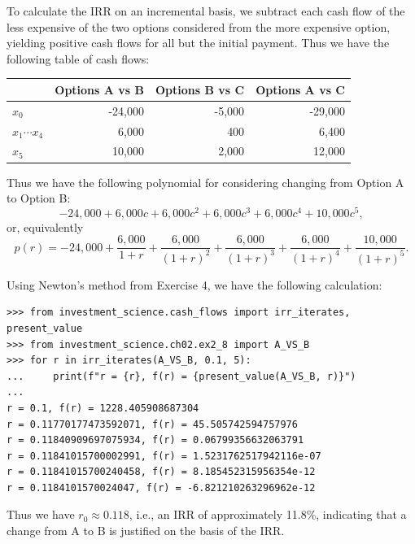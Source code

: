 To calculate the IRR on an incremental basis, we subtract each cash flow of
the less expensive of the two options considered from the more expensive
option, yielding positive cash flows for all but the initial payment. Thus we
have the following table of cash flows:
\begin{center}
    \begin{tabular}{l|r|r|r}
        & Options A vs B & Options B vs C & Options A vs C \\
        \hline
        $x_0$ & -24,000 & -5,000 & -29,000 \\
        $x_1 \cdots x_4$ & 6,000 & 400 & 6,400 \\
        $x_5$ & 10,000 & 2,000 & 12,000
    \end{tabular}
\end{center}

Thus we have the following polynomial for considering changing from Option A
to Option B:
\[
    -24,000 + 6,000c + 6,000c^2 + 6,000c^3 + 6,000c^4 + 10,000c^5,
\]
or, equivalently
\[
    p(r) = -24,000 + \frac{6,000}{1 + r} + \frac{6,000}{{(1 + r)}^2}
    + \frac{6,000}{{(1 + r)}^3} + \frac{6,000}{{(1 + r)}^4}
    + \frac{10,000}{{(1 + r)}^5}.
\]

Using Newton's method from Exercise 4, we have the following calculation:
\begin{lstlisting}
>>> from investment_science.cash_flows import irr_iterates, present_value
>>> from investment_science.ch02.ex2_8 import A_VS_B
>>> for r in irr_iterates(A_VS_B, 0.1, 5):
...     print(f"r = {r}, f(r) = {present_value(A_VS_B, r)}")
...
r = 0.1, f(r) = 1228.405908687304
r = 0.11770177473592071, f(r) = 45.505742594757976
r = 0.11840909697075934, f(r) = 0.06799356632063791
r = 0.11841015700002991, f(r) = 1.5231762517942116e-07
r = 0.11841015700240458, f(r) = 8.185452315956354e-12
r = 0.1184101570024047, f(r) = -6.821210263296962e-12
\end{lstlisting}
Thus we have $r_0 \approx 0.118$, i.e., an IRR of approximately 11.8\%,
indicating that a change from A to B is justified on the basis of the IRR.
